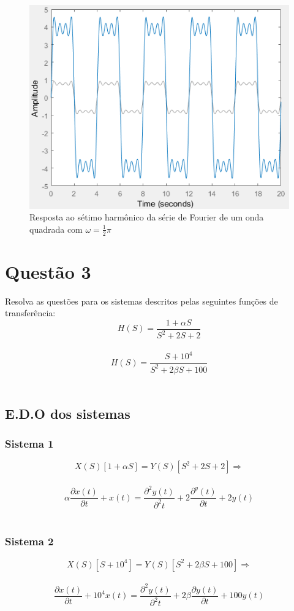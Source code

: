 \documentclass[a4paper, 12pt]{article}
\begin{document}
			\begin{figure}[!ht]
				\centering
				\includegraphics[scale=0.71]{img/2l.png}
				\caption{Resposta ao sétimo harmônico da série de Fourier de um onda quadrada com $\omega = \frac{1}{2}\pi$}	
			\end{figure}		
			\clearpage
							
	\section{Quest\~{a}o 3}
		Resolva as questões para os sistemas descritos pelas seguintes funções de transferência:
		\[
		H(S)= \frac{1 + \alpha S}{S^{2} + 2S +  2}
		\] 	\\			
		\[
		H(S)= \frac{S + 10^{4}}{S^{2} + 2\beta S +  100}
		\] 	\\				
		
		\subsection{E.D.O dos sistemas}

			\subsubsection{Sistema 1}
				\[
				X(S)[1+ \alpha S] = Y(S)[S^{2} + 2S + 2] \Rightarrow
				\] 	\\			
				\[						
				\alpha \frac{\partial x(t)}{\partial t} + x(t) = \frac{\partial^{2}y(t)}{\partial^{2}t} + 2\frac{\partial^y(t)}{\partial t} + 2y(t)
				\] 	\\				
			\subsubsection{Sistema 2}
				\[
				X(S)[S + 10^{4}] = Y(S)[S^{2} + 2\beta S +  100] \Rightarrow
				\] 	\\			
				\[						
				\frac{\partial x(t)}{\partial t} + 10^{4}x(t) = \frac{\partial^{2}y(t)}{\partial^{2}t} + 2 \beta\frac{\partial y(t)}{\partial t} + 100y(t)
				\] 	\\				
				\newpage
\end{document}
